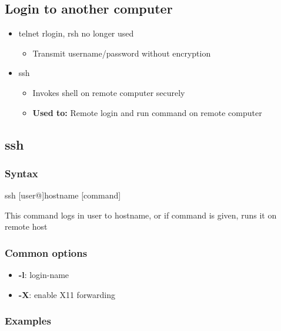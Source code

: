 \documentclass{report}
\begin{document}
    \subsection{Login to another computer}
    \bigbreak \noindent 
    \begin{itemize}
        \item telnet rlogin, rsh no longer used
            \begin{itemize}
                \item Transmit username/password without encryption
            \end{itemize}
        \item ssh
            \begin{itemize}
                \item Invokes shell on remote computer securely
                \item \textbf{Used to:} Remote login and run command on remote computer
            \end{itemize}
    \end{itemize}

    \bigbreak \noindent 
    \subsection{ssh}

    \bigbreak \noindent 
    \subsubsection{Syntax}
    \begin{bashcode}
        ssh [user@]hostname [command]
    \end{bashcode}
    \bigbreak \noindent 
    This command logs in user to hostname, or if command is given, runs it on remote host 

    \bigbreak \noindent 
    \subsubsection{Common options}
    \bigbreak \noindent 
    \begin{itemize}
        \item \textbf{-l}: login-name 
        \item \textbf{-X}: enable X11 forwarding
    \end{itemize}

    \bigbreak \noindent 
    \subsubsection{Examples}
    \bigbreak \noindent 
\end{document}
